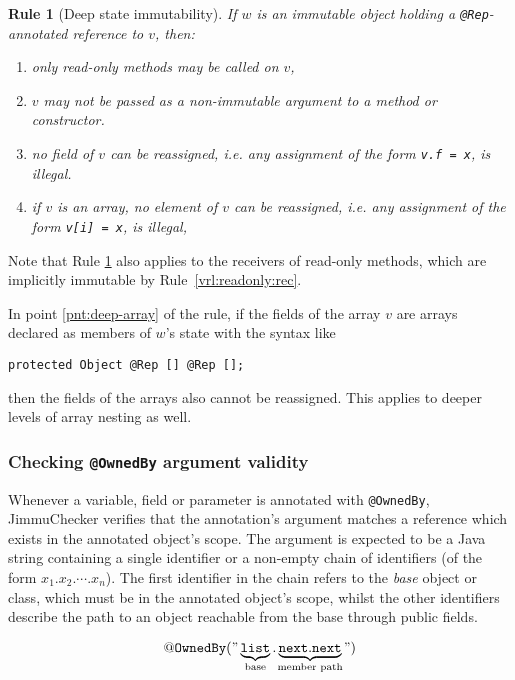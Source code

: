 \documentclass{pracamgr}
\theoremstyle{break}
\theoremstyle{break}
\theoremstyle{break}
\newtheorem{verrule}{Rule}
\begin{document}
\begin{verrule}[Deep state immutability] \label{vrl:deepimm}
  If $w$ is an immutable object holding a \texttt{@Rep}-annotated
  reference to $v$, then:
  \begin{enumerate}[label=(\arabic*)]
  \item only read-only methods may be called on $v$, 
  \item $v$ may not be passed as a non-immutable argument to a method
    or constructor.
  \item no field of $v$ can be reassigned, i.e. any assignment of the
    form \texttt{v.f~=~x}, is illegal.
  \item \label{pnt:deep-array} if $v$ is an array, no element of $v$
    can be reassigned, i.e. any assignment of the form
    \texttt{v[i]~=~x}, is illegal,
  \end{enumerate}
\end{verrule}
Note that Rule \ref{vrl:deepimm} also applies to the receivers of
read-only methods, which are implicitly immutable by
Rule~\ref{vrl:readonly:rec}. 

In point \ref{pnt:deep-array} of the rule, if the fields of the
array $v$ are arrays declared as members of $w$'s state with the
syntax like
\begin{center}
  \texttt{protected Object @Rep [] @Rep [];}
\end{center}
then the fields of the arrays also cannot be reassigned. This applies
to deeper levels of array nesting as well. 

\subsubsection{Checking \texttt{@OwnedBy} argument validity} 

Whenever a variable, field or parameter is annotated with
\texttt{@OwnedBy}, JimmuChecker verifies that the annotation's
argument matches a reference which exists in the annotated object's
scope. The argument is expected to be a Java string containing a
single identifier or a non-empty chain of identifiers (of the form
$x_1.x_2.\cdots.x_n$). The first identifier in the chain refers to the
\emph{base} object or class, which must be in the annotated object's
scope, whilst the other identifiers describe the path to an object
reachable from the base through public fields.

$$ \mathtt{@OwnedBy("}\underbrace{\mathtt{list}}_{\mathclap{\textrm{base}}} 
\mathtt{.}
\underbrace{\mathtt{next.next}}_{\mathclap{\textrm{member path}}}\mathtt{")} $$
\end{document}
